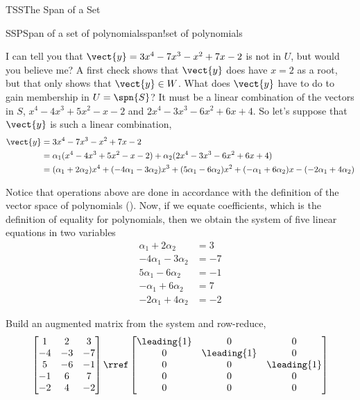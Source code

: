 \begin{subsect}{TSS}{The Span of a Set}
\begin{example}{SSP}{Span of a set of polynomials}{span!set of polynomials}
%
\begin{para}I can tell you that $\vect{y}=3x^4-7x^3-x^2+7x-2$ is not in $U$, but would you believe me?  A first check shows that $\vect{y}$ does have $x=2$ as a root, but that only shows that $\vect{y}\in W$.  What does $\vect{y}$ have to do to gain membership in $U=\spn{S}$?  It must be a linear combination of the vectors in $S$, $x^4-4x^3+5x^2-x-2$ and $2x^4-3x^3-6x^2+6x+4$.  So let's suppose that $\vect{y}$ is such a linear combination,
%
\begin{align*}
\vect{y}
&=3x^4-7x^3-x^2+7x-2\\
&=\alpha_1(x^4-4x^3+5x^2-x-2)+\alpha_2(2x^4-3x^3-6x^2+6x+4)\\
&=
(\alpha_1+2\alpha_2)x^4+
(-4\alpha_1-3\alpha_2)x^3+
(5\alpha_1-6\alpha_2)x^2+
(-\alpha_1+6\alpha_2)x-
(-2\alpha_1+4\alpha_2)
\end{align*}
\end{para}
%
\begin{para}Notice that operations above are done in accordance with the definition of the vector space of polynomials ().  Now, if we equate coefficients, which is the definition of equality for polynomials, then we obtain the system of five linear equations in two variables
%
\begin{align*}
\alpha_1+2\alpha_2&=3\\
-4\alpha_1-3\alpha_2&=-7\\
5\alpha_1-6\alpha_2&=-1\\
-\alpha_1+6\alpha_2&=7\\
-2\alpha_1+4\alpha_2&=-2
\end{align*}
\end{para}
%
\begin{para}Build an augmented matrix from the system and row-reduce,
%
\begin{equation*}
%
\begin{bmatrix}
1 & 2 & 3\\
-4 & -3 & -7\\
5 & -6 & -1\\
-1 & 6 & 7\\
-2 & 4 & -2
\end{bmatrix}
%
\rref
%
\begin{bmatrix}
\leading{1} & 0 & 0\\
0 & \leading{1} & 0\\
0 & 0 & \leading{1}\\
0 & 0 & 0\\
0 & 0 & 0
\end{bmatrix}

\end{equation*}
\end{para}
\end{example}
\end{subsect}

